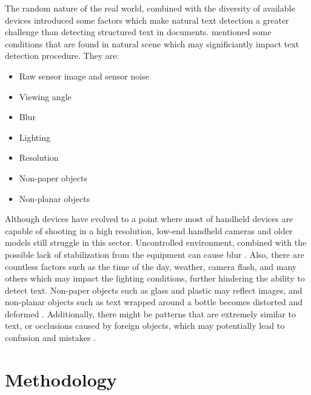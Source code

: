 \documentclass[10pt, a4paper]{article}
\begin{document}
The random nature of the real world, combined with the diversity of available devices introduced some factors which make natural text detection a greater challenge than detecting structured text in documents. \cite{NaturalScene} mentioned some conditions that are found in natural scene which may significiantly impact text detection procedure. They are:
\begin{itemize}
	\item Raw sensor image and sensor noise
	\item Viewing angle
	\item Blur
	\item Lighting
	\item Resolution
	\item Non-paper objects
	\item Non-planar objects
\end{itemize}
Although devices have evolved to a point where most of handheld devices are capable of shooting in a high resolution, low-end handheld cameras and older models still struggle in this sector.
Uncontrolled environment, combined with the possible lack of stabilization from the equipment can cause blur \citep{Rosebrockeast}. Also, there are countless factors such as the time of the day, weather, camera flash, and many others which may impact the lighting conditions, further hindering the ability to detect text. Non-paper objects such as glass and plastic may reflect images, and non-planar objects such as text wrapped around a bottle becomes distorted and deformed \citep{Rosebrockeast}.
Additionally, there might be patterns that are extremely similar to text, or occlusions caused by foreign objects, which may potentially lead to confusion and mistakes \citep{LongEtAl}.

\clearpage

\section{Methodology} %
\label{sec:methodology}
\end{document}
